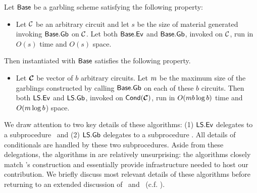 \begin{theorem}
  Let $\textsf{Base}$ be a garbling scheme satisfying the following
  property:
  \begin{itemize}
    \item Let $\mathcal C$ be an arbitrary circuit and let $s$ be the size of
      material generated invoking $\textsf{Base}.\textsf{Gb}$ on $\mathcal C$.
      Let both $\textsf{Base}.\textsf{Ev}$ and $\textsf{Base}.\textsf{Gb}$, invoked
      on $\mathcal C$, run in $O(s)$ time and $O(s)$ space.
  \end{itemize}
  Then  instantiated with $\textsf{Base}$ satisfies the
  following property.
  \begin{itemize}
    \item Let $\vec{\cir}$ be  vector of $b$ arbitrary circuits. Let $m$ be
      the maximum size of the garblings constructed by calling
      $\textsf{Base}.\textsf{Gb}$ on each of these $b$ circuits.
      Then both $\textsf{LS}.\textsf{Ev}$ and $\textsf{LS}.\textsf{Gb}$, invoked on
      $\conditional(\vec{\cir})$, run in
      $O(m b \log b)$ time and $O(m \log b$) space.
  \end{itemize}
\end{theorem}

We draw attention to two key details of these algorithms:
(1) $\textsf{LS}.\textsf{Ev}$ delegates to a subprocedure \evcond\ and (2)
$\textsf{LS}.\textsf{Gb}$ delegates to a subprocedure \gbcond.
%
All details of conditionals are handled by these two subprocedures.
%
Aside from these delegations, the algorithms in  are
relatively unsurprising:
the algorithms closely match \HK's construction and essentially
provide 
infrastructure needed to host our contribution.
%
We briefly discuss most relevant details of these 
algorithms before returning
to an extended discussion of \evcond\ and \gbcond~(c.f. ).

